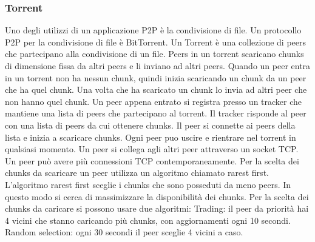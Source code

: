 \documentclass[12pt]{article}
\begin{document}
\subsubsection{Torrent}
Uno degli utilizzi di un applicazione P2P è la condivisione di file.
Un protocollo P2P per la condivisione di file è BitTorrent.
Un Torrent è una collezione di peers che partecipano alla condivisione di un file.
Peers in un torrent scaricano chunks di dimensione fissa da altri peers e li inviano ad altri peers.
Quando un peer entra in un torrent non ha nessun chunk, quindi inizia scaricando un chunk da un peer che ha quel chunk.
Una volta che ha scaricato un chunk lo invia ad altri peer che non hanno quel chunk.
Un peer appena entrato si registra presso un tracker che mantiene una lista di peers che partecipano al torrent.
Il tracker risponde al peer con una lista di peers da cui ottenere chunks.
Il peer si connette ai peers della lista e inizia a scaricare chunks.
Ogni peer puo uscire e rientrare nel torrent in qualsiasi momento.
Un peer si collega agli altri peer attraverso un socket TCP.
Un peer può avere più connessioni TCP contemporaneamente.
Per la scelta dei chunks da scaricare un peer utilizza un algoritmo chiamato rarest first.
L'algoritmo rarest first sceglie i chunks che sono posseduti da meno peers.
In questo modo si cerca di massimizzare la disponibilità dei chunks.
Per la scelta dei chunks da caricare si possono usare due algoritmi:
Trading: il peer da priorità hai 4 vicini che stanno caricando più chunks, con aggiornamenti ogni 10 secondi.
Random selection: ogni 30 secondi il peer sceglie 4 vicini a caso.
\end{document}
